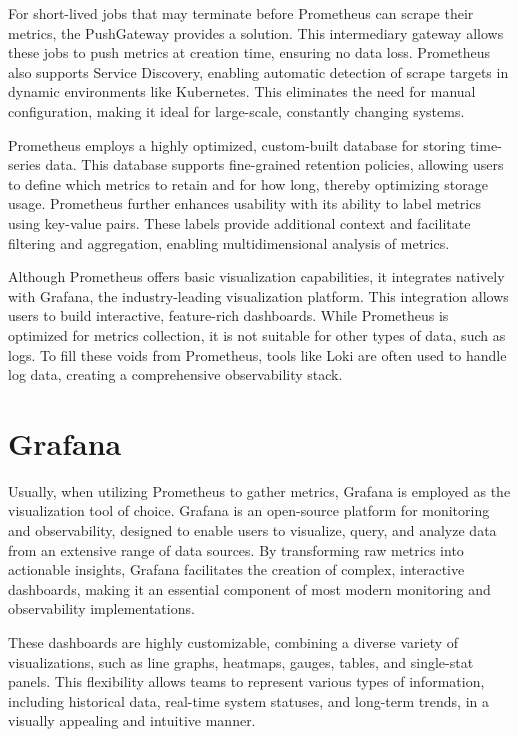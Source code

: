 For short-lived jobs that may terminate before Prometheus can scrape their metrics, the PushGateway provides a solution. This intermediary gateway allows these jobs to push metrics at creation time, ensuring no data loss. Prometheus also supports Service Discovery, enabling automatic detection of scrape targets in dynamic environments like Kubernetes. This eliminates the need for manual configuration, making it ideal for large-scale, constantly changing systems.

Prometheus employs a highly optimized, custom-built database for storing time-series data. This database supports fine-grained retention policies, allowing users to define which metrics to retain and for how long, thereby optimizing storage usage. Prometheus further enhances usability with its ability to label metrics using key-value pairs. These labels provide additional context and facilitate filtering and aggregation, enabling multidimensional analysis of metrics.

Although Prometheus offers basic visualization capabilities, it integrates natively with Grafana, the industry-leading visualization platform. This integration allows users to build interactive, feature-rich dashboards. While Prometheus is optimized for metrics collection, it is not suitable for other types of data, such as logs. To fill these voids from Prometheus, tools like Loki are often used to handle log data, creating a comprehensive observability stack.\cite{Jani2024-mg,Pragathi2024-fa}



\section{Grafana}
Usually, when utilizing Prometheus to gather metrics, Grafana is employed as the visualization tool of choice. Grafana is an open-source platform for monitoring and observability, designed to enable users to visualize, query, and analyze data from an extensive range of data sources. By transforming raw metrics into actionable insights, Grafana facilitates the creation of complex, interactive dashboards, making it an essential component of most modern monitoring and observability implementations.

These dashboards are highly customizable, combining a diverse variety of visualizations, such as line graphs, heatmaps, gauges, tables, and single-stat panels. This flexibility allows teams to represent various types of information, including historical data, real-time system statuses, and long-term trends, in a visually appealing and intuitive manner.

